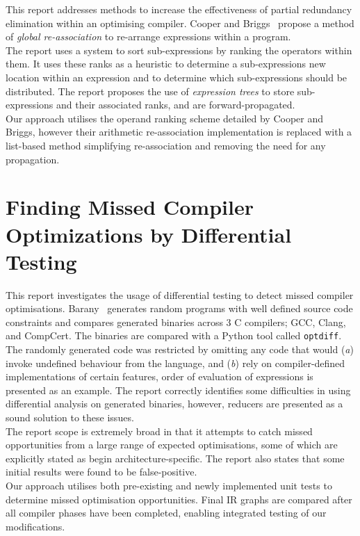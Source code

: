 \documentclass[12pt,openany,a4paper]{book}
\begin{document}
This report addresses methods to increase the effectiveness of partial redundancy
elimination within an optimising compiler. Cooper and Briggs~\cite{effective-pre} propose 
a method of
\emph{global re-association} to re-arrange expressions within a program.\\
The report uses a system to sort sub-expressions by ranking the operators within
them. It uses these ranks as a heuristic to determine a sub-expressions new
location within an expression and to determine which sub-expressions should be
distributed. The report proposes the use of \emph{expression trees} to store sub-expressions 
and their associated ranks, and are forward-propagated. \\
Our approach utilises the operand ranking scheme detailed 
by Cooper and Briggs, however their arithmetic re-association implementation is 
replaced with a list-based method simplifying re-association and removing the 
need for any propagation.

\section{Finding Missed Compiler Optimizations by Differential Testing}
\label{litrev2}

This report investigates the usage of differential testing to detect missed
compiler optimisations. Barany~\cite{missed-opt} generates random programs with well defined
source code constraints and compares generated binaries across 3 C compilers; GCC,
Clang, and CompCert. The binaries are compared with a Python tool called 
\verb|optdiff|. The randomly generated code was restricted by omitting any code
that would (\emph{a}) invoke undefined behaviour from the language, and (\emph{b}) rely on 
compiler-defined implementations of certain features, order of evaluation of
expressions is presented as an example. The report correctly identifies some 
difficulties in using differential analysis on generated binaries, however, 
reducers are presented as a sound solution to these issues.\\
The report scope is extremely broad in that it attempts to catch missed
opportunities from a large range of expected optimisations, some of which are
explicitly stated as begin architecture-specific. The report also states that
some initial results were found to be false-positive.\\
Our approach utilises both pre-existing and newly implemented unit tests to 
determine missed optimisation opportunities. Final IR graphs are compared 
after all compiler phases have been completed, enabling integrated testing of
our modifications.
\end{document}

